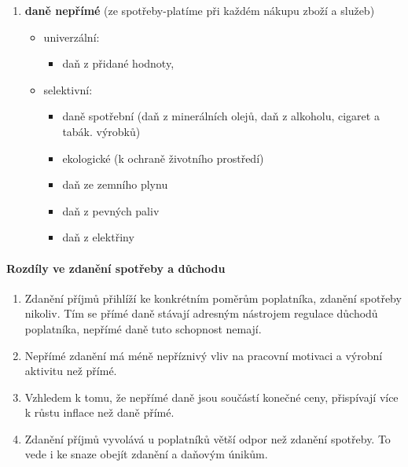 \begin{description}
\begin{enumerate}
\begin{itemize}
\begin{itemize}
                        \end{itemize}
                \end{itemize}
            \item \textbf{daně nepřímé} (ze spotřeby-platíme při každém nákupu zboží a služeb)
                \begin{itemize}
                    \item univerzální:
                        \begin{itemize}
                            \item daň z přidané hodnoty,
                        \end{itemize}
                    \item selektivní:
                        \begin{itemize}
                            \item daně spotřební (daň z minerálních olejů, daň z alkoholu, cigaret a tabák. výrobků)
                            \item ekologické (k ochraně životního prostředí)
                            \item daň ze zemního plynu
                            \item daň z pevných paliv
                            \item daň z elektřiny
                        \end{itemize}
                \end{itemize}
        \end{enumerate}
\end{description}

\paragraph{Rozdíly ve zdanění spotřeby a důchodu}
\begin{enumerate}
    \item Zdanění příjmů přihlíží ke konkrétním poměrům poplatníka, zdanění spotřeby nikoliv. Tím se přímé daně stávají adresným nástrojem regulace důchodů poplatníka, nepřímé daně tuto schopnost nemají.
    \item Nepřímé zdanění má méně nepříznivý vliv na pracovní motivaci a výrobní aktivitu než přímé.
    \item Vzhledem k tomu, že nepřímé daně jsou součástí konečné ceny, přispívají více k růstu inflace než daně přímé.
    \item Zdanění příjmů vyvolává u poplatníků větší odpor než zdanění spotřeby. To vede i ke snaze obejít zdanění a daňovým únikům.
\end{enumerate}

